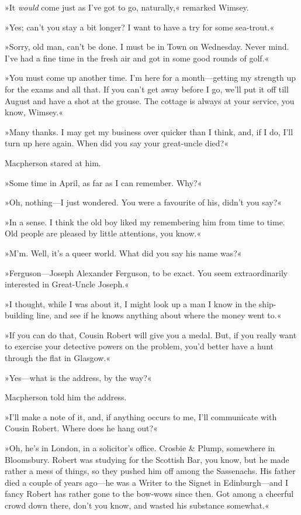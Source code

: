 »It \textit{would} come just as I've got to go, naturally,« remarked Wimsey.

»Yes; can't you stay a bit longer? I want to have a try for some sea-trout.«

»Sorry, old man, can't be done. I must be in Town on Wednesday. Never mind. I've had a fine time in the fresh air and got in some good rounds of golf.«

»You must come up another time. I'm here for a month—getting my strength up for the exams and all that. If you can't get away before I go, we'll put it off till August and have a shot at the grouse. The cottage is always at your service, you know, Wimsey.«

»Many thanks. I may get my business over quicker than I think, and, if I do, I'll turn up here again. When did you say your great-uncle died?«

Macpherson stared at him.

»Some time in April, as far as I can remember. Why?«

»Oh, nothing—I just wondered. You were a favourite of his, didn't you say?«

»In a sense. I think the old boy liked my remembering him from time to time. Old people are pleased by little attentions, you know.«

»M'm. Well, it's a queer world. What did you say his name was?«

»Ferguson—Joseph Alexander Ferguson, to be exact. You seem extraordinarily interested in Great-Uncle Joseph.«

»I thought, while I was about it, I might look up a man I know in the ship-building line, and see if he knows anything about where the money went to.«

»If you can do that, Cousin Robert will give you a medal. But, if you really want to exercise your detective powers on the problem, you'd better have a hunt through the flat in Glasgow.«

»Yes—what is the address, by the way?«

Macpherson told him the address.

»I'll make a note of it, and, if anything occurs to me, I'll communicate with Cousin Robert. Where does he hang out?«

»Oh, he's in London, in a solicitor's office. Crosbie \& Plump, somewhere in Bloomsbury. Robert was studying for the Scottish Bar, you know, but he made rather a mess of things, so they pushed him off among the Sassenachs. His father died a couple of years ago—he was a Writer to the Signet in Edinburgh—and I fancy Robert has rather gone to the bow-wows since then. Got among a cheerful crowd down there, don't you know, and wasted his substance somewhat.«


